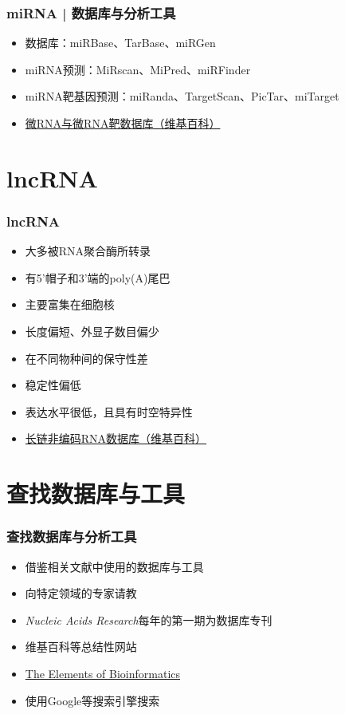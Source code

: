 \begin{frame}
	\frametitle{miRNA | 数据库与分析工具}
	\begin{itemize}
		\item 数据库：miRBase、TarBase、miRGen
		\item miRNA预测：MiRscan、MiPred、miRFinder 
		\item miRNA靶基因预测：miRanda、TargetScan、PicTar、miTarget
		\item \href{http://zh.wikipedia.org/wiki/\%E5\%BE\%AERNA\%E4\%B8\%8E\%E5\%BE\%AERNA\%E9\%9D\%B6\%E6\%95\%B0\%E6\%8D\%AE\%E5\%BA\%93}{微RNA与微RNA靶数据库（维基百科）}
	\end{itemize}
\end{frame}

\section{lncRNA}
\begin{frame}
	\frametitle{lncRNA}
	\begin{itemize}
		\item 大多被RNA聚合酶所转录
		\item 有5'帽子和3'端的poly(A)尾巴
		\item 主要富集在细胞核
		\item 长度偏短、外显子数目偏少
		\item 在不同物种间的保守性差
		\item 稳定性偏低
		\item 表达水平很低，且具有时空特异性
		\item \href{http://zh.wikipedia.org/wiki/\%E9\%95\%BF\%E9\%93\%BE\%E9\%9D\%9E\%E7\%BC\%96\%E7\%A0\%81RNA\%E6\%95\%B0\%E6\%8D\%AE\%E5\%BA\%93}{长链非编码RNA数据库（维基百科）}
	\end{itemize}
\end{frame}

\section{查找数据库与工具}
\begin{frame}
	\frametitle{查找数据库与分析工具}
	\begin{itemize}
	\item 借鉴相关文献中使用的数据库与工具
	\item 向特定领域的专家请教
	\item \textit{Nucleic Acids Research}每年的第一期为数据库专刊
	\item 维基百科等总结性网站
	\item \href{http://elements.eaglegenomics.com/}{The Elements of Bioinformatics}
	\item 使用Google等搜索引擎搜索
	\end{itemize}
\end{frame}

